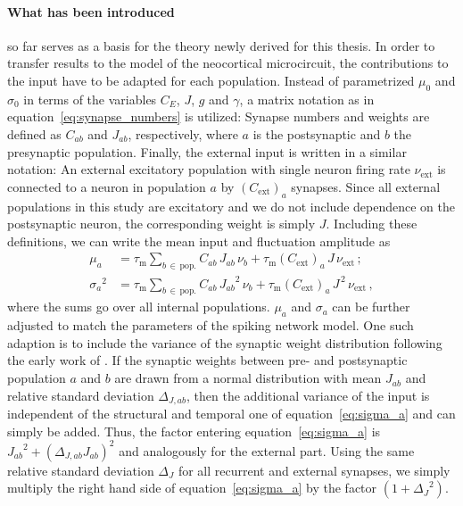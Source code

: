 \paragraph{What has been introduced}so far serves as a basis for the theory newly derived for this
thesis. In order to transfer results to the model of the neocortical microcircuit, 
the contributions to the input have to be adapted for each population. 
Instead of 
parametrized $\mu_0$ and $\sigma_0$ in terms of the variables $C_E$, $J$, $g$ and $\gamma$, 
a matrix notation as in equation~\eqref{eq:synapse_numbers} is utilized: 
Synapse numbers and weights are defined as $C_{ab}$ and $J_{ab}$, respectively, 
where $a$ is the postsynaptic and $b$ the presynaptic population. 
Finally, the external input is written in a similar notation: 
An external excitatory population with single neuron firing rate $\nu_\text{ext}$ 
is connected to a neuron in population $a$ by 
$(C_\text{ext})_a$ synapses. Since all external populations in this study are 
excitatory and we do not include dependence on the postsynaptic neuron, 
the corresponding weight is simply $J$.
Including these definitions, we can write the mean input and fluctuation amplitude
as
\begin{align}
    \label{eq:mu_a}
    \mu_a        &= 
        \tau_\text{m} \sum_{b \,\in \,\text{pop.}} C_{ab} \, J_{ab} \, \nu_b 
        + \tau_\text{m} (C_\text{ext})_a \, J \, \nu_\text{ext} \, ; \\
    \label{eq:sigma_a}
    {\sigma_a}^2 &= 
        \tau_\text{m} \sum_{b \,\in \,\text{pop.}} C_{ab} \, {J_{ab}}^2  \, \nu_b
        + \tau_\text{m} (C_\text{ext})_a \,J^{\,2} \,\nu_\text{ext}\,,
\end{align}
where the sums go over all internal populations. 
$\mu_a$ and $\sigma_a$ can be further adjusted to match the parameters of the spiking network 
model. One such adaption is to include the variance of the synaptic weight distribution 
following the early work of . 
If the synaptic weights between pre- and postsynaptic population $a$ and $b$ are drawn
from a normal distribution with mean $J_{ab}$ and relative standard deviation $\Delta_{J, ab}$, 
then the additional variance of the input is independent of the structural and temporal one
of equation~\eqref{eq:sigma_a} and can simply be added. 
Thus, the factor entering equation~\eqref{eq:sigma_a} is 
${J_{ab}}^2 + (\Delta_{J, ab} {J_{ab}})^2$ and analogously for the external part.
Using the same relative standard deviation 
$\Delta_J$ for all recurrent and external synapses, we simply multiply the right 
hand side of equation~\eqref{eq:sigma_a} by the factor $(1 + {\Delta_J}^2)$.


